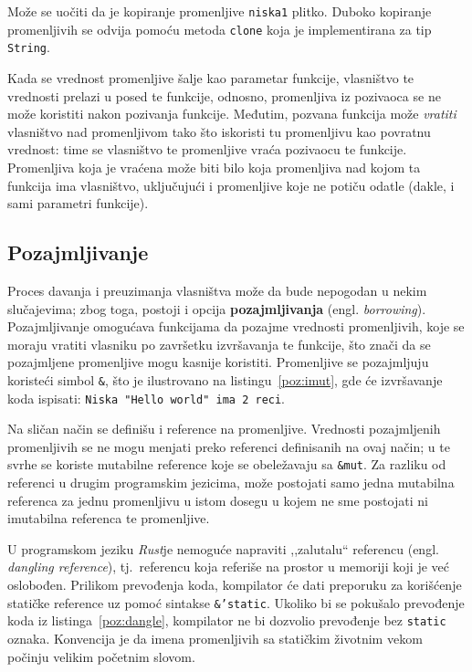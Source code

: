 \documentclass[12pt,oneside]{memoir}
\begin{document}
Može se uočiti da je kopiranje promenljive \texttt{niska1} plitko. Duboko kopiranje promenljivih
se odvija pomoću metoda \texttt{clone} koja je implementirana za tip \texttt{String}.


Kada se vrednost promenljive šalje kao parametar funkcije, vlasništvo te vrednosti prelazi
u posed te funkcije, odnosno, promenljiva iz pozivaoca se ne može koristiti nakon pozivanja funkcije.
Međutim, pozvana funkcija može \emph{vratiti} vlasništvo nad promenljivom tako što iskoristi tu
promenljivu kao povratnu vrednost: time se vlasništvo te promenljive vraća pozivaocu te funkcije.
Promenljiva koja je vraćena može biti bilo koja promenljiva nad kojom ta funkcija ima vlasništvo,
uključujući i promenljive koje ne potiču odatle (dakle, i sami parametri funkcije).

\subsection{Pozajmljivanje}\label{subsec:pozajmljivanje}
Proces davanja i preuzimanja vlasništva može da bude nepogodan u nekim slučajevima; zbog toga,
postoji i opcija \textbf{pozajmljivanja} (engl. \emph{borrowing}). Pozajmljivanje omogućava
funkcijama da pozajme vrednosti promenljivih, koje se moraju vratiti vlasniku po završetku
izvršavanja te funkcije, što znači da se pozajmljene promenljive mogu kasnije koristiti.
Promenljive se pozajmljuju koristeći simbol \texttt{\&}, što je ilustrovano na
listingu~\ref{poz:imut}, gde će izvršavanje koda ispisati: \texttt{Niska "Hello world"
ima 2 reci}.



Na sličan način se definišu i reference na promenljive. Vrednosti pozajmljenih promenljivih se ne
mogu menjati preko referenci definisanih na ovaj način; u te svrhe
se koriste mutabilne reference koje se obeležavaju sa \texttt{\&mut}. Za razliku od referenci
u drugim programskim jezicima, može postojati samo jedna mutabilna referenca za jednu
promenljivu u istom dosegu u kojem ne sme postojati ni imutabilna referenca te promenljive.

U programskom jeziku \emph{Rust}je nemoguće napraviti
,,zalutalu`` referencu (engl. \emph{dangling reference}),
tj.\ referencu koja referiše na prostor u memoriji koji je već oslobođen. Prilikom prevođenja
koda, kompilator će dati preporuku za korišćenje statičke reference uz pomoć sintakse
\texttt{\&'static}. Ukoliko bi se pokušalo prevođenje koda iz listinga~\ref{poz:dangle},
kompilator ne bi dozvolio prevođenje bez \texttt{static} oznaka. Konvencija je da imena
promenljivih sa statičkim životnim vekom počinju velikim početnim slovom.
\end{document}
